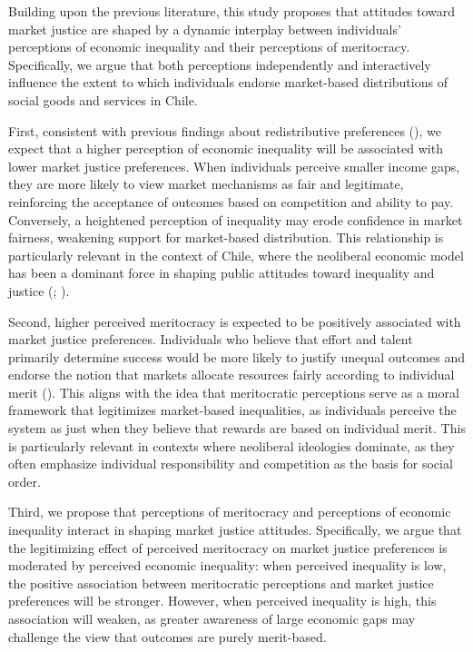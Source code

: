 \documentclass[
  12pt,
]{article}
\begin{document}
Building upon the previous literature, this study proposes that
attitudes toward market justice are shaped by a dynamic interplay
between individuals' perceptions of economic inequality and their
perceptions of meritocracy. Specifically, we argue that both perceptions
independently and interactively influence the extent to which
individuals endorse market-based distributions of social goods and
services in Chile.

First, consistent with previous findings about redistributive
preferences (), we expect that a higher perception of economic inequality will
be associated with lower market justice preferences. When individuals
perceive smaller income gaps, they are more likely to view market
mechanisms as fair and legitimate, reinforcing the acceptance of
outcomes based on competition and ability to pay. Conversely, a
heightened perception of inequality may erode confidence in market
fairness, weakening support for market-based distribution. This
relationship is particularly relevant in the context of Chile, where the
neoliberal economic model has been a dominant force in shaping public
attitudes toward inequality and justice
(;
).

Second, higher perceived meritocracy is expected to be positively
associated with market justice preferences. Individuals who believe that
effort and talent primarily determine success would be more likely to
justify unequal outcomes and endorse the notion that markets allocate
resources fairly according to individual merit
().
This aligns with the idea that meritocratic perceptions serve as a moral
framework that legitimizes market-based inequalities, as individuals
perceive the system as just when they believe that rewards are based on
individual merit. This is particularly relevant in contexts where
neoliberal ideologies dominate, as they often emphasize individual
responsibility and competition as the basis for social order.

Third, we propose that perceptions of meritocracy and perceptions of
economic inequality interact in shaping market justice attitudes.
Specifically, we argue that the legitimizing effect of perceived
meritocracy on market justice preferences is moderated by perceived
economic inequality: when perceived inequality is low, the positive
association between meritocratic perceptions and market justice
preferences will be stronger. However, when perceived inequality is
high, this association will weaken, as greater awareness of large
economic gaps may challenge the view that outcomes are purely
merit-based.
\end{document}
